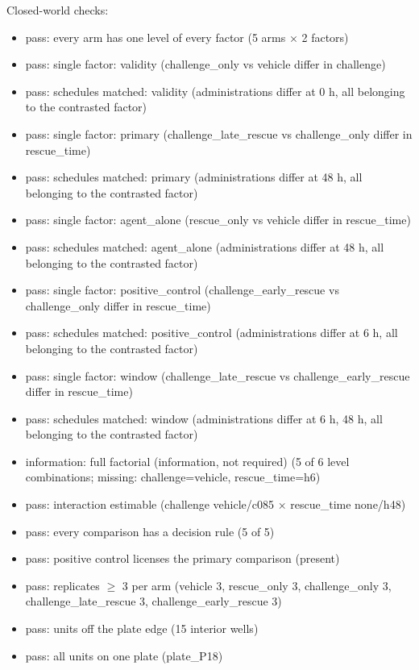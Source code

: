 \documentclass[10pt,a4paper]{article}
\begin{document}
\par\smallskip Closed-world checks:\begin{itemize}[nosep]
\item \textcolor{green!50!black}{pass}: every arm has one level of every factor (5 arms × 2 factors)
\item \textcolor{green!50!black}{pass}: single factor: validity (challenge\_only vs vehicle differ in challenge)
\item \textcolor{green!50!black}{pass}: schedules matched: validity (administrations differ at 0 h, all belonging to the contrasted factor)
\item \textcolor{green!50!black}{pass}: single factor: primary (challenge\_late\_rescue vs challenge\_only differ in rescue\_time)
\item \textcolor{green!50!black}{pass}: schedules matched: primary (administrations differ at 48 h, all belonging to the contrasted factor)
\item \textcolor{green!50!black}{pass}: single factor: agent\_alone (rescue\_only vs vehicle differ in rescue\_time)
\item \textcolor{green!50!black}{pass}: schedules matched: agent\_alone (administrations differ at 48 h, all belonging to the contrasted factor)
\item \textcolor{green!50!black}{pass}: single factor: positive\_control (challenge\_early\_rescue vs challenge\_only differ in rescue\_time)
\item \textcolor{green!50!black}{pass}: schedules matched: positive\_control (administrations differ at 6 h, all belonging to the contrasted factor)
\item \textcolor{green!50!black}{pass}: single factor: window (challenge\_late\_rescue vs challenge\_early\_rescue differ in rescue\_time)
\item \textcolor{green!50!black}{pass}: schedules matched: window (administrations differ at 6 h, 48 h, all belonging to the contrasted factor)
\item information: full factorial (information, not required) (5 of 6 level combinations; missing: challenge=vehicle, rescue\_time=h6)
\item \textcolor{green!50!black}{pass}: interaction estimable (challenge vehicle/c085 × rescue\_time none/h48)
\item \textcolor{green!50!black}{pass}: every comparison has a decision rule (5 of 5)
\item \textcolor{green!50!black}{pass}: positive control licenses the primary comparison (present)
\item \textcolor{green!50!black}{pass}: replicates $\geq$ 3 per arm (vehicle 3, rescue\_only 3, challenge\_only 3, challenge\_late\_rescue 3, challenge\_early\_rescue 3)
\item \textcolor{green!50!black}{pass}: units off the plate edge (15 interior wells)
\item \textcolor{green!50!black}{pass}: all units on one plate (plate\_P18)
\end{itemize}
\end{document}
